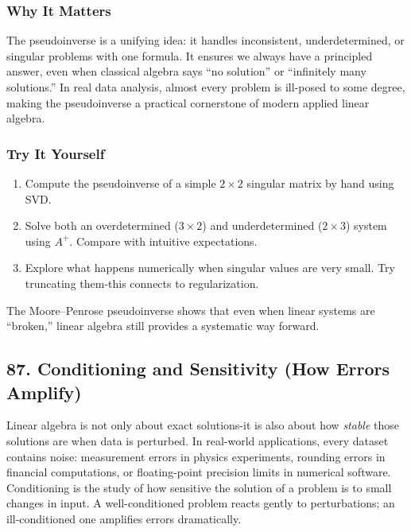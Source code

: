 \documentclass[
  letterpaper,
  DIV=11,
  numbers=noendperiod]{scrreprt}
\providecommand{\tightlist}{%
  \setlength{\itemsep}{0pt}\setlength{\parskip}{0pt}}
\begin{document}
\subsubsection{Why It Matters}\label{why-it-matters-82}

The pseudoinverse is a unifying idea: it handles inconsistent,
underdetermined, or singular problems with one formula. It ensures we
always have a principled answer, even when classical algebra says ``no
solution'' or ``infinitely many solutions.'' In real data analysis,
almost every problem is ill-posed to some degree, making the
pseudoinverse a practical cornerstone of modern applied linear algebra.

\subsubsection{Try It Yourself}\label{try-it-yourself-85}

\begin{enumerate}
\def\labelenumi{\arabic{enumi}.}
\tightlist
\item
  Compute the pseudoinverse of a simple \(2 \times 2\) singular matrix
  by hand using SVD.
\item
  Solve both an overdetermined (\(3 \times 2\)) and underdetermined
  (\(2 \times 3\)) system using \(A^+\). Compare with intuitive
  expectations.
\item
  Explore what happens numerically when singular values are very small.
  Try truncating them-this connects to regularization.
\end{enumerate}

The Moore--Penrose pseudoinverse shows that even when linear systems are
``broken,'' linear algebra still provides a systematic way forward.

\subsection{87. Conditioning and Sensitivity (How Errors
Amplify)}\label{conditioning-and-sensitivity-how-errors-amplify}

Linear algebra is not only about exact solutions-it is also about how
\emph{stable} those solutions are when data is perturbed. In real-world
applications, every dataset contains noise: measurement errors in
physics experiments, rounding errors in financial computations, or
floating-point precision limits in numerical software. Conditioning is
the study of how sensitive the solution of a problem is to small changes
in input. A well-conditioned problem reacts gently to perturbations; an
ill-conditioned one amplifies errors dramatically.
\end{document}
